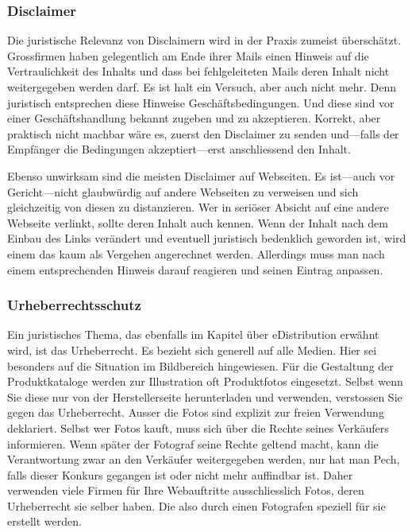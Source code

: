 \subsubsection*{Disclaimer}

Die juristische Relevanz von Disclaimern wird in der Praxis zumeist überschätzt.
Grossfirmen haben gelegentlich am Ende ihrer Mails einen Hinweis auf die
Vertraulichkeit des Inhalts und dass bei fehlgeleiteten Mails deren Inhalt
nicht weitergegeben werden darf. Es ist halt ein Versuch, aber auch nicht
mehr. Denn juristisch entsprechen diese Hinweise Geschäftsbedingungen.
Und diese sind vor einer Geschäftshandlung bekannt zugeben und zu akzeptieren.
Korrekt, aber praktisch nicht machbar wäre es, zuerst den Disclaimer zu
senden und---falls der Empfänger die Bedingungen akzeptiert---erst anschliessend
den Inhalt.

Ebenso unwirksam sind die meisten Disclaimer auf Webseiten. Es ist---auch vor
Gericht---nicht glaubwürdig auf andere Webseiten zu verweisen und sich gleichzeitig
von diesen zu distanzieren. Wer in seriöser Absicht auf eine andere Webseite
verlinkt, sollte deren Inhalt auch kennen. Wenn der Inhalt nach dem Einbau des
Links verändert und eventuell juristisch bedenklich geworden ist, wird einem
das kaum als Vergehen angerechnet werden. Allerdings muss man nach einem
entsprechenden Hinweis darauf reagieren und seinen Eintrag anpassen.

\subsubsection*{Urheberrechtsschutz}

Ein juristisches Thema, das ebenfalls im Kapitel über eDistribution erwähnt
wird, ist das Urheberrecht. Es bezieht sich generell auf alle Medien. Hier
sei besonders auf die Situation im Bildbereich hingewiesen. Für die
Gestaltung der Produktkataloge werden zur Illustration oft Produktfotos
eingesetzt. Selbst wenn Sie diese nur von der Herstellerseite herunterladen
und verwenden, verstossen Sie gegen das Urheberrecht. Ausser die Fotos
sind explizit zur freien Verwendung deklariert. Selbst wer Fotos kauft,
muss sich über die Rechte seines Verkäufers informieren. Wenn später der
Fotograf seine Rechte geltend macht, kann die Verantwortung zwar an den
Verkäufer weitergegeben werden, nur hat man Pech, falls dieser Konkurs
gegangen ist oder nicht mehr auffindbar ist. Daher verwenden viele Firmen
für Ihre Webauftritte ausschliesslich Fotos, deren Urheberrecht sie selber
haben. Die also durch einen Fotografen speziell für sie erstellt werden.

